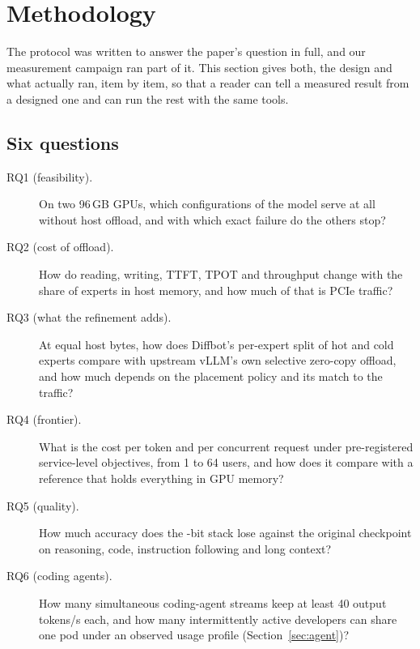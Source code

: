 \section{Methodology}\label{sec:method}

The protocol was written to answer the paper's question in full, and our measurement campaign ran part of it. This
section gives both, the design and what actually ran, item by item, so that a reader can tell a measured result from a
designed one and can run the rest with the same tools.

\subsection{Six questions}
\begin{description}
\item[RQ1 (feasibility).] On two 96\,GB GPUs, which configurations of the model serve at all without host offload, and
with which exact failure do the others stop?
\item[RQ2 (cost of offload).] How do reading, writing, TTFT, TPOT and throughput change with the share of experts in
host memory, and how much of that is PCIe traffic?
\item[RQ3 (what the refinement adds).] At equal host bytes, how does Diffbot's per-expert split of hot and cold experts
compare with upstream vLLM's own selective zero-copy offload, and how much depends on the placement policy and its
match to the traffic?
\item[RQ4 (frontier).] What is the cost per token and per concurrent request under pre-registered service-level
objectives, from 1 to 64 users, and how does it compare with a reference that holds everything in GPU memory?
\item[RQ5 (quality).] How much accuracy does the -bit stack lose against the original checkpoint on
reasoning, code, instruction following and long context?
\item[RQ6 (coding agents).] How many simultaneous coding-agent streams keep at least 40 output tokens/s each, and how
many intermittently active developers can share one pod under an observed usage profile (Section~\ref{sec:agent})?
\end{description}

